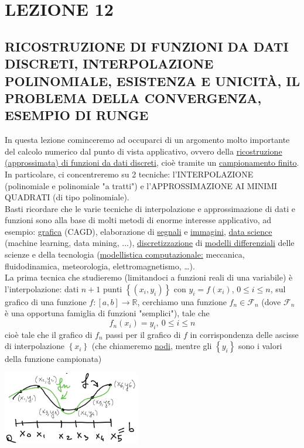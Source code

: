 \documentclass[12pt]{article}
\begin{document}
\section*{LEZIONE 12}
\subsection*{RICOSTRUZIONE DI FUNZIONI DA DATI DISCRETI, INTERPOLAZIONE POLINOMIALE, ESISTENZA E UNICITÀ, IL PROBLEMA DELLA CONVERGENZA, ESEMPIO DI RUNGE}

In questa lezione cominceremo ad occuparci di un argomento molto importante del calcolo numerico dal punto di vista applicativo, ovvero della \underline{ricostruzione (approssimata) di funzioni da dati discreti}, cioè tramite un \underline{campionamento finito}.\\
In particolare, ci concentreremo su 2 tecniche: l'INTERPOLAZIONE (polinomiale e polinomiale "a tratti") e l'APPROSSIMAZIONE AI MINIMI QUADRATI (di tipo polinomiale).\\
Basti ricordare che le varie tecniche di interpolazione e approssimazione di dati e funzioni sono alla base di molti metodi di enorme interesse applicativo, ad esempio: \underline{grafica} (CAGD), elaborazione di \underline{segnali} e \underline{immagini}, \underline{data science} (machine learning, data mining, $\dotsc$), \underline{discretizzazione} di \underline{modelli differenziali} delle scienze e della tecnologia (\underline{modellistica computazionale:} meccanica, fluidodinamica, meteorologia, elettromagnetismo, \dots). \\
La prima tecnica che studieremo (limitandoci a funzioni reali di una variabile) è l'interpolazione: dati $n+1$ punti $\left\{ (x_i, y_i) \right\}$ con $y_i=f(x_i)$, $0 \leq i \leq n$, sul grafico di una funzione $f:[a,b] \rightarrow \mathbb{R}$, cerchiamo una funzione $f_n \in \mathcal{F}_n$ (dove $\mathcal{F}_n$ è una opportuna famiglia di funzioni "semplici"), tale che
\[
    f_n(x_i) = y_i, \ 0 \leq i \leq n
\]
cioè tale che il grafico di $f_n$ passi per il grafico di $f$ in corrispondenza delle ascisse di interpolazione $\left\{ x_i \right\}$ (che chiameremo \underline{nodi}, mentre gli $\left\{ y_i \right\}$ sono i valori della funzione campionata)
\begin{center}
    \includegraphics[width=0.45\textwidth]{pag4_img1.png}
\end{center}
\end{document}
